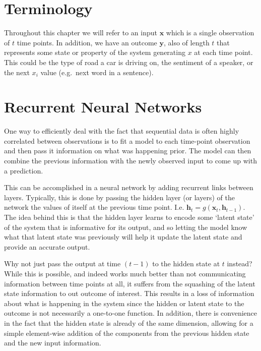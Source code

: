 \documentclass[]{book}
\theoremstyle{definition}
\theoremstyle{definition}
\theoremstyle{definition}
\theoremstyle{remark}
\begin{document}
\section{Terminology}\label{terminology-1}

Throughout this chapter we will refer to an input \(\textbf{x}\) which
is a single observation of \(t\) time points. In addition, we have an
outcome \(\textbf{y}\), also of length \(t\) that represents some state
or property of the system generating \(x\) at each time point. This
could be the type of road a car is driving on, the sentiment of a
speaker, or the next \(x_i\) value (e.g.~next word in a sentence).

\section{Recurrent Neural Networks}\label{recurrent-neural-networks}

One way to efficiently deal with the fact that sequential data is often
highly correlated between observations is to fit a model to each
time-point observation and then pass it information on what was
happening prior. The model can then combine the previous information
with the newly observed input to come up with a prediction.

This can be accomplished in a neural network by adding recurrent links
between layers. Typically, this is done by passing the hidden layer (or
layers) of the network the values of itself at the previous time point.
I.e. \(\textbf{h}_{t} = g(\textbf{x}_t, \textbf{h}_{t - 1})\). The idea
behind this is that the hidden layer learns to encode some `latent
state' of the system that is informative for its output, and so letting
the model know what that latent state was previously will help it update
the latent state and provide an accurate output.

Why not just pass the output at time \((t-1)\) to the hidden state at
\(t\) instead? While this is possible, and indeed works much better than
not communicating information between time points at all, it suffers
from the squashing of the latent state information to out outcome of
interest. This results in a loss of information about what is happening
in the system since the hidden or latent state to the outcome is not
necessarily a one-to-one function. In addition, there is convenience in
the fact that the hidden state is already of the same dimension,
allowing for a simple element-wise addition of the components from the
previous hidden state and the new input information.
\end{document}
